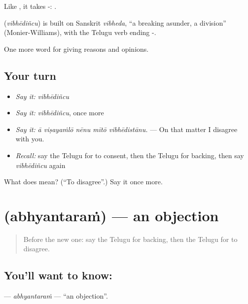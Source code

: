 Like , it takes -:  .

\begin{cousinweb}
\textbf{} (\emph{vibhēdiñcu}) is built on Sanskrit \emph{vibheda}, \textquotedblleft{}a breaking asunder, a division\textquotedblright{} (Monier-Williams), with the Telugu verb ending -.
\end{cousinweb}

\begin{grammarlens}[title={What you've built}]
One more word for giving reasons and opinions.
\end{grammarlens}

\subsection*{Your turn}
\begin{itemize}
\raggedright
  \item \emph{Say it:} \emph{vibhēdiñcu}
  \item \emph{Say it:} \emph{vibhēdiñcu}, once more
  \item \emph{Say it:} \emph{ā viṣayaṁlō nēnu mītō vibhēdistānu.} — On that matter I disagree with you.
  \item \emph{Recall:} say the Telugu for to consent, then the Telugu for backing, then say \emph{vibhēdiñcu} again
\end{itemize}

\begin{tcolorbox}[breakable,colback=teal!4,colframe=teal!35!black,title={Before you move on}]
What does  mean? (\textquotedblleft{}To disagree\textquotedblright{}.) Say it once more.
\end{tcolorbox}
\section[\texorpdfstring{\te{అభ్యంతరం} (abhyantaraṁ)}{అభ్యంతరం (abhyantaraṁ)}]{ (abhyantaraṁ) — an objection}

\label{lesson:TE-C386-abhyantaram}



\begin{quote}
Before the new one: say the Telugu for backing, then the Telugu for to disagree.
\end{quote}

\subsection*{You'll want to know: }
\textbf{} — \emph{abhyantaraṁ} — \textquotedblleft{}an objection\textquotedblright{}.

